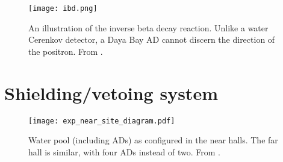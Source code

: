 \documentclass[../thesis.tex]{subfiles}
\begin{document}
\begin{figure}[ht]
  \texttt{[image: ibd.png]}
  \caption{An illustration of the inverse beta decay reaction. Unlike a water Cerenkov detector, a Daya Bay AD cannot discern the direction of the positron. From \cite{Fernandez_2017}.}
  \label{fig:expIBD}
\end{figure}

\section{Shielding/vetoing system}
\label{sec:expShieldVeto}

\begin{figure}[ht]
  \texttt{[image: exp\_near\_site\_diagram.pdf]}
  \caption{Water pool (including ADs) as configured in the near halls. The far hall is similar, with four ADs instead of two. From \cite{An_2017}.}
  \label{fig:expPool}
\end{figure}

\subfilebackmatter
\end{document}
